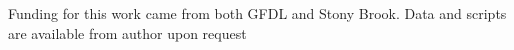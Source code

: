 \documentclass[draft]{agujournal2019}
\begin{document}
%
%
%
%
%
%
\acknowledgments
Funding for this work came from both GFDL and Stony Brook.  Data and scripts are available from author upon request



  
\end{document}
